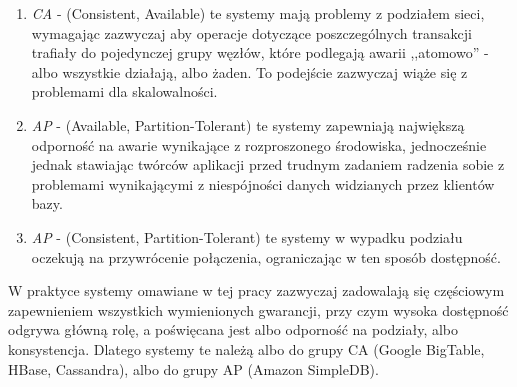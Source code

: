 \documentclass[a4paper,11pt]{article}
\begin{document}
\begin{enumerate}
 \item \emph{CA} - (Consistent, Available) te systemy mają problemy z podziałem
sieci, wymagając zazwyczaj aby operacje dotyczące poszczególnych transakcji
trafiały do pojedynczej grupy węzłów, które podlegają awarii ,,atomowo'' -
albo wszystkie działają, albo żaden. To podejście zazwyczaj wiąże się z
problemami dla skalowalności.
 \item \emph{AP} - (Available, Partition-Tolerant) te systemy zapewniają
największą odporność na awarie wynikające z rozproszonego środowiska,
jednocześnie jednak stawiając twórców aplikacji przed trudnym zadaniem radzenia
sobie z problemami wynikającymi z niespójności danych widzianych przez klientów
bazy.
 \item \emph{AP} - (Consistent, Partition-Tolerant) te systemy w wypadku
podziału oczekują na przywrócenie połączenia, ograniczając w ten sposób
dostępność.
\end{enumerate}

W praktyce systemy omawiane w tej pracy zazwyczaj zadowalają się częściowym
zapewnieniem wszystkich wymienionych gwarancji, przy czym wysoka dostępność
odgrywa główną rolę, a poświęcana jest albo odporność na podziały, albo
konsystencja. Dlatego systemy te należą albo do grupy CA (Google BigTable,
HBase, Cassandra), albo do grupy AP (Amazon SimpleDB). 


\end{document}
